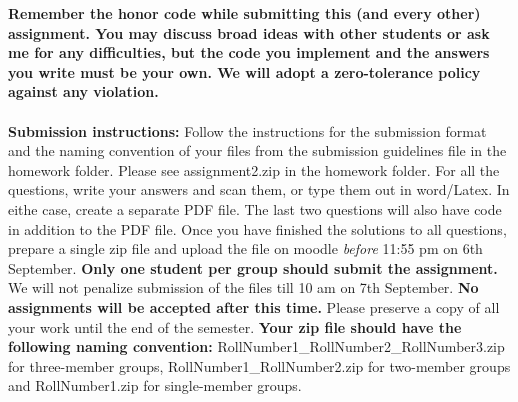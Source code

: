 \documentclass[11pt]{article}
\begin{document}
\maketitle

\textbf{Remember the honor code while submitting this (and every other) assignment. You may discuss broad ideas with other students or ask me for any difficulties, but the code you implement and the answers you write must be your own. We will adopt a \textbf{zero-tolerance policy} against any violation.}
\\
\\
\textbf{Submission instructions:} Follow the instructions for the submission format and the naming convention of your files from the submission guidelines file in the homework folder. Please see \textsf{assignment2.zip} in the homework folder. For all the questions, write your answers and scan them, or type them out in word/Latex. In eithe case, create a separate PDF file. The last two questions will also have code in addition to the PDF file. Once you have finished the solutions to all questions, prepare a single zip file and upload the file on moodle \emph{before} 11:55 pm on 6th September.  \textbf{Only one student per group should submit the assignment.} We will not penalize submission of the files till 10 am on 7th September. \textbf{No assignments will be accepted after this time.} Please preserve a copy of all your work until the end of the semester.  \textbf{Your zip file should have the following naming convention:} RollNumber1\_RollNumber2\_RollNumber3.zip for three-member groups, RollNumber1\_RollNumber2.zip for two-member groups and RollNumber1.zip for single-member groups. 
\end{document}
